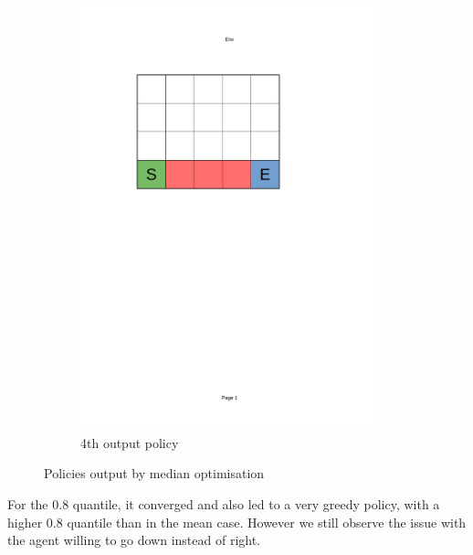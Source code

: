 \begin{figure}[!ht]
\begin{subfigure}{0.24\textwidth}
            \includegraphics[page=9, trim = 40mm 40mm 70mm 165mm, clip, width=0.95\textwidth]{figures/personal_work/policies.pdf}
        \caption{4th output policy}
    \end{subfigure}
        \caption{Policies output by median optimisation}
\end{figure}

For the $0.8$ quantile, it converged and also led to a very greedy policy, with a higher $0.8$ quantile than in the mean case. However we still observe the issue with the agent willing to go down instead of right. 

